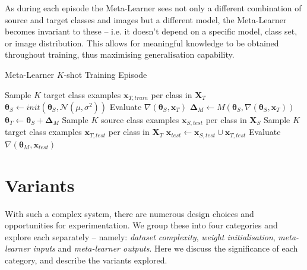\documentclass{report}
\begin{document}
As during each episode the Meta-Learner sees not only a different combination of source and target classes and images but a different model, the Meta-Learner becomes invariant to these -- i.e. it doesn't depend on a specific  model, class set, or image distribution. This allows for meaningful knowledge to be obtained throughout training, thus maximising generalisation capability. \par

\begin{algorithm}[h!]
	\caption{Meta-Learner $K$-shot Training Episode}
	\label{alg-episode}
	\begin{algorithmic}[1]
		\State Sample $K$ target class examples $\bm{x}_{T,train}$ per class in $\bm{X}_T$
		\State $\bm{\theta}_S \gets init(\bm{\theta}_S, \mathcal{N}(\mu, \sigma^2))$
		\State Evaluate $\nabla(\bm{\theta}_S,\bm{x}_T)$
		\State $\bm{\Delta}_M \gets M(\bm{\theta}_S, \nabla(\bm{\theta}_S,\bm{x}_T))$
		\State $\bm{\theta}_T \gets \bm{\theta}_S + \bm{\Delta}_M$
		\State Sample $K$ source class examples $\bm{x}_{S,test}$ per class in $\bm{X}_S$
		\State Sample $K$ target class examples $\bm{x}_{T,test}$ per class in $\bm{X}_T$
		\State $\bm{x}_{test} \gets \bm{x}_{S,test} \cup \bm{x}_{T,test}$
		\State Evaluate $\nabla(\bm{\theta}_M, \bm{x}_{test})$
	\end{algorithmic}
\end{algorithm}

\section{Variants} \label{approaches}
With such a complex system, there are numerous design choices and opportunities for experimentation. We group these into four categories and explore each separately -- namely: \textit{dataset complexity}, \textit{weight initialisation}, \textit{meta-learner inputs} and \textit{meta-learner outputs}. Here we discuss the significance of each category, and describe the variants explored. \par
\end{document}
